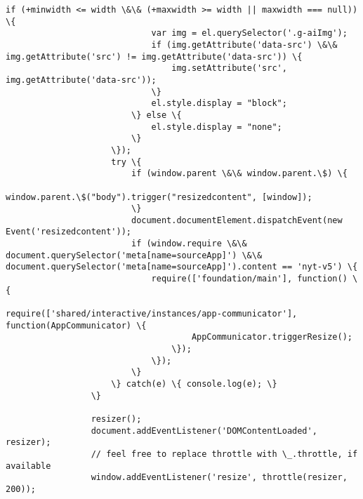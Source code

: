 \documentclass[11pt]{article}
\begin{document}
\begin{Verbatim}[commandchars=\\\{\}]
                         if (+minwidth <= width \&\& (+maxwidth >= width || maxwidth === null)) \{
                             var img = el.querySelector('.g-aiImg');
                             if (img.getAttribute('data-src') \&\& img.getAttribute('src') != img.getAttribute('data-src')) \{
                                 img.setAttribute('src', img.getAttribute('data-src'));
                             \}
                             el.style.display = "block";
                         \} else \{
                             el.style.display = "none";
                         \}
                     \});
                     try \{
                         if (window.parent \&\& window.parent.\$) \{
                             window.parent.\$("body").trigger("resizedcontent", [window]);
                         \}
                         document.documentElement.dispatchEvent(new Event('resizedcontent'));
                         if (window.require \&\& document.querySelector('meta[name=sourceApp]') \&\& document.querySelector('meta[name=sourceApp]').content == 'nyt-v5') \{
                             require(['foundation/main'], function() \{
                                 require(['shared/interactive/instances/app-communicator'], function(AppCommunicator) \{
                                     AppCommunicator.triggerResize();
                                 \});
                             \});
                         \}
                     \} catch(e) \{ console.log(e); \}
                 \}
         
                 resizer();
                 document.addEventListener('DOMContentLoaded', resizer);
                 // feel free to replace throttle with \_.throttle, if available
                 window.addEventListener('resize', throttle(resizer, 200));        
         

\end{Verbatim}
\end{document}
